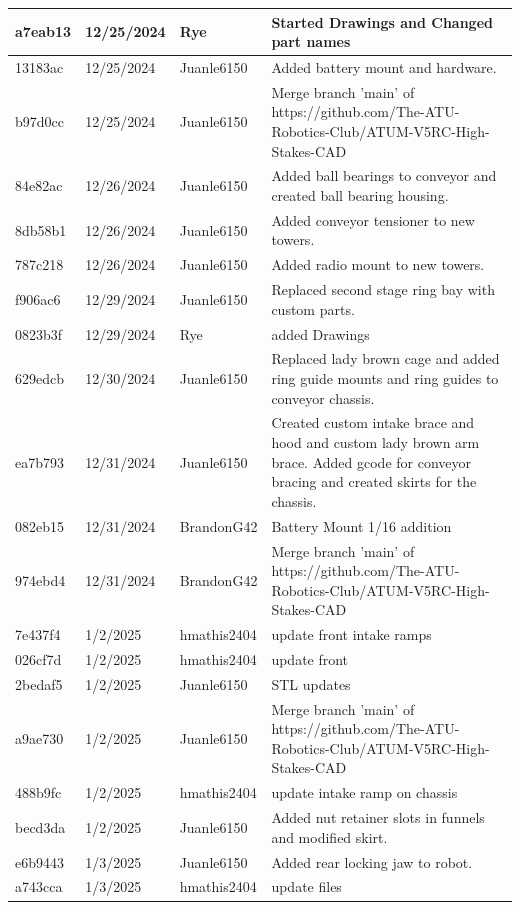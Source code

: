 \begin{center}
\begin{longtable}{|p{28pt}|p{33pt}|p{40pt}|p{300pt}|}
\hline
a7eab13 & 12/25/2024 & Rye & Started Drawings and Changed part names \\
\hline
13183ac & 12/25/2024 & Juanle6150 & Added battery mount and hardware. \\
\hline
b97d0cc & 12/25/2024 & Juanle6150 & Merge branch 'main' of https://github.com/The-ATU-Robotics-Club/ATUM-V5RC-High-Stakes-CAD \\
\hline
84e82ac & 12/26/2024 & Juanle6150 & Added ball bearings to conveyor and created ball bearing housing. \\
\hline
8db58b1 & 12/26/2024 & Juanle6150 & Added conveyor tensioner to new towers. \\
\hline
787c218 & 12/26/2024 & Juanle6150 & Added radio mount to new towers. \\
\hline
f906ac6 & 12/29/2024 & Juanle6150 & Replaced second stage ring bay with custom parts. \\
\hline
0823b3f & 12/29/2024 & Rye & added Drawings \\
\hline
629edcb & 12/30/2024 & Juanle6150 & Replaced lady brown cage and added ring guide mounts and ring guides to conveyor chassis. \\
\hline
ea7b793 & 12/31/2024 & Juanle6150 & Created custom intake brace and hood and custom lady brown arm brace. Added gcode for conveyor bracing and created skirts for the chassis. \\
\hline
082eb15 & 12/31/2024 & BrandonG42 & Battery Mount 1/16 addition \\
\hline
974ebd4 & 12/31/2024 & BrandonG42 & Merge branch 'main' of https://github.com/The-ATU-Robotics-Club/ATUM-V5RC-High-Stakes-CAD \\
\hline
7e437f4 & 1/2/2025 & hmathis2404 & update front intake ramps \\
\hline
026cf7d & 1/2/2025 & hmathis2404 & update front \\
\hline
2bedaf5 & 1/2/2025 & Juanle6150 & STL updates \\
\hline
a9ae730 & 1/2/2025 & Juanle6150 & Merge branch 'main' of https://github.com/The-ATU-Robotics-Club/ATUM-V5RC-High-Stakes-CAD \\
\hline
488b9fc & 1/2/2025 & hmathis2404 & update intake ramp on chassis \\
\hline
becd3da & 1/2/2025 & Juanle6150 & Added nut retainer slots in funnels and modified skirt. \\
\hline
e6b9443 & 1/3/2025 & Juanle6150 & Added rear locking jaw to robot. \\
\hline
a743cca & 1/3/2025 & hmathis2404 & update files \\

\end{longtable}
\end{center}
